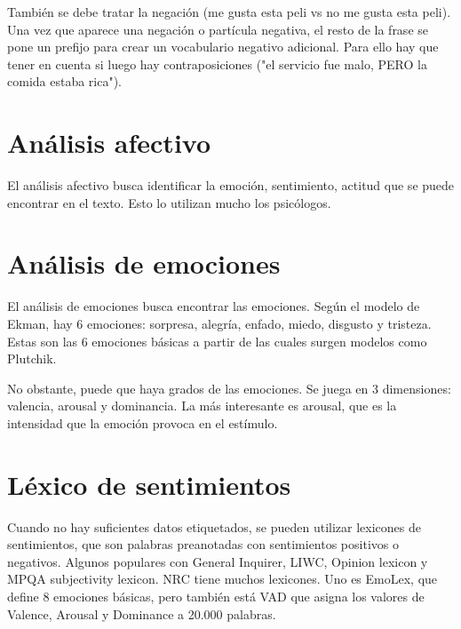 También se debe tratar la negación (me gusta esta peli vs no me gusta esta peli). Una vez que aparece una negación o partícula negativa, el resto de la frase se pone un prefijo para crear un vocabulario negativo adicional. Para ello hay que tener en cuenta si luego hay contraposiciones ("el servicio fue malo, PERO la comida estaba rica").

\section{Análisis afectivo}
El análisis afectivo busca identificar la emoción, sentimiento, actitud que se puede encontrar en el texto. Esto lo utilizan mucho los psicólogos. 

\section{Análisis de emociones}
El análisis de emociones busca encontrar las emociones. Según el modelo de Ekman, hay 6 emociones: sorpresa, alegría, enfado, miedo, disgusto y tristeza. Estas son las 6 emociones básicas a partir de las cuales surgen modelos como Plutchik. 

No obstante, puede que haya grados de las emociones. Se juega en 3 dimensiones: valencia, arousal y dominancia. La más interesante es arousal, que es la intensidad que la emoción provoca en el estímulo. 

\section{Léxico de sentimientos}
Cuando no hay suficientes datos etiquetados, se pueden utilizar lexicones de sentimientos, que son palabras preanotadas con sentimientos positivos o negativos. Algunos populares con General Inquirer, LIWC, Opinion lexicon y MPQA subjectivity lexicon. NRC tiene muchos lexicones. Uno es EmoLex, que define 8 emociones básicas, pero también está VAD que asigna los valores de Valence, Arousal y Dominance a 20.000 palabras. 
